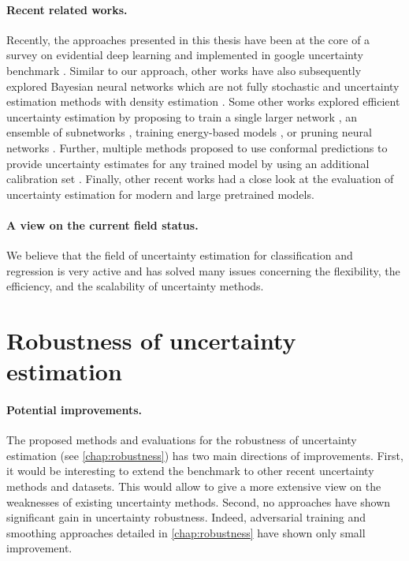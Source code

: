 \paragraph{Recent related works.} Recently, the approaches presented in this thesis have been  at the core of a survey on evidential deep learning \cite{survey_evidential_uncertainty} and implemented in google uncertainty benchmark \cite{nado2021uncertainty}. Similar to our approach, other works have also subsequently explored Bayesian neural networks which are not fully stochastic \cite{bnnfullystochastic2022sharma} and uncertainty estimation methods with density estimation \cite{du2022vos, postels2020hiddenuncertainty, uncertainty-generative-classifier}. Some other works explored efficient uncertainty estimation by proposing to train a single larger network \cite{abe2022deep}, an ensemble of subnetworks \cite{mimo-independent-subnetworks}, training energy-based models \cite{ood_ebm}, or pruning neural networks \cite{ayle2022robustness-sparse}. Further, multiple methods proposed to use conformal predictions to provide uncertainty estimates for any trained model by using an additional calibration set \cite{conformal-survey, Park2020PAC}. Finally, other recent works \cite{minderer2021revisiting, tran2022plex} had a close look at the evaluation of uncertainty estimation for modern and large pretrained models.

\paragraph{A view on the current field status.} We believe that the field of uncertainty estimation for classification and regression is very active and has solved many issues concerning the flexibility, the efficiency, and the scalability of uncertainty methods.

\section{Robustness of uncertainty estimation} 

\paragraph{Potential improvements.} The proposed methods and evaluations for the robustness of uncertainty estimation (see \cref{chap:robustness}) has two main directions of improvements. First, it would be interesting to extend the benchmark to other recent uncertainty methods and datasets. This would allow to give a more extensive view on the weaknesses of existing uncertainty methods. Second, no approaches have shown significant gain in uncertainty robustness. Indeed, adversarial training and smoothing approaches detailed in \cref{chap:robustness} have shown only small improvement.

